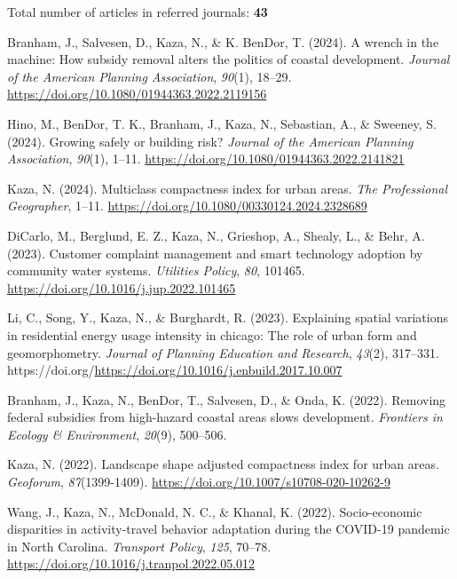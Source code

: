 \documentclass[11pt,a4paper,]{awesome-cv}
\newlength{\cslhangindent}
\newenvironment{CSLReferences}[2] %
 {\begin{list}{}{%
  \setlength{\itemindent}{0pt}
  \setlength{\leftmargin}{0pt}
  \setlength{\parsep}{0pt}
  \ifodd #1
   \setlength{\leftmargin}{\cslhangindent}
   \setlength{\itemindent}{-1\cslhangindent}
  \fi
  \setlength{\itemsep}{#2\baselineskip}}}
 {\end{list}}
\begin{document}
Total number of articles in referred journals: \textbf{43}

\label{refs-92333bf2587d2e2928ed3fc723ae37ba}
\begin{CSLReferences}{1}{0}
Branham, J., Salvesen, D., Kaza, N., \& K. BenDor, T. (2024). A wrench
in the machine: How subsidy removal alters the politics of coastal
development. \emph{Journal of the American Planning Association},
\emph{90}(1), 18--29.
\url{https://doi.org/10.1080/01944363.2022.2119156}

Hino, M., BenDor, T. K., Branham, J., Kaza, N., Sebastian, A., \&
Sweeney, S. (2024). Growing safely or building risk? \emph{Journal of
the American Planning Association}, \emph{90}(1), 1--11.
\url{https://doi.org/10.1080/01944363.2022.2141821}

Kaza, N. (2024). Multiclass compactness index for urban areas. \emph{The
Professional Geographer}, 1--11.
\url{https://doi.org/10.1080/00330124.2024.2328689}

DiCarlo, M., Berglund, E. Z., Kaza, N., Grieshop, A., Shealy, L., \&
Behr, A. (2023). Customer complaint management and smart technology
adoption by community water systems. \emph{Utilities Policy}, \emph{80},
101465. \url{https://doi.org/10.1016/j.jup.2022.101465}

Li, C., Song, Y., Kaza, N., \& Burghardt, R. (2023). Explaining spatial
variations in residential energy usage intensity in chicago: The role of
urban form and geomorphometry. \emph{Journal of Planning Education and
Research}, \emph{43}(2), 317--331.
https://doi.org/\url{https://doi.org/10.1016/j.enbuild.2017.10.007}

Branham, J., Kaza, N., BenDor, T., Salvesen, D., \& Onda, K. (2022).
Removing federal subsidies from high-hazard coastal areas slows
development. \emph{Frontiers in Ecology \& Environment}, \emph{20}(9),
500--506.

Kaza, N. (2022). Landscape shape adjusted compactness index for urban
areas. \emph{Geoforum}, \emph{87}(1399-1409).
\url{https://doi.org/10.1007/s10708-020-10262-9}

Wang, J., Kaza, N., McDonald, N. C., \& Khanal, K. (2022).
Socio-economic disparities in activity-travel behavior adaptation during
the COVID-19 pandemic in North Carolina. \emph{Transport Policy},
\emph{125}, 70--78. \url{https://doi.org/10.1016/j.tranpol.2022.05.012}


\end{CSLReferences}
\end{document}
